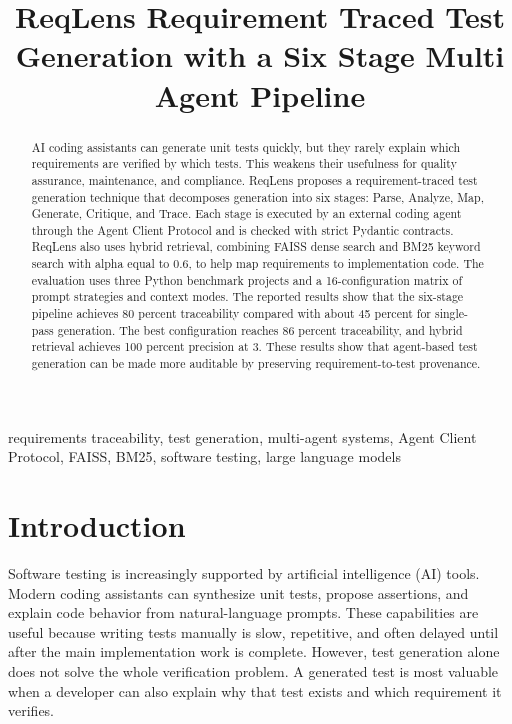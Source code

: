 \documentclass[conference]{IEEEtran}
\begin{document}
\title{ReqLens Requirement Traced Test Generation with a Six Stage Multi Agent Pipeline}

\author{
}

\maketitle

\begin{abstract}
AI coding assistants can generate unit tests quickly, but they rarely explain
which requirements are verified by which tests. This weakens their usefulness
for quality assurance, maintenance, and compliance. ReqLens proposes a
requirement-traced test generation technique that decomposes generation into
six stages: Parse, Analyze, Map, Generate, Critique, and Trace. Each stage is
executed by an external coding agent through the Agent Client Protocol and is
checked with strict Pydantic contracts. ReqLens also uses hybrid retrieval,
combining FAISS dense search and BM25 keyword search with alpha equal to 0.6,
to help map requirements to implementation code. The evaluation uses three
Python benchmark projects and a 16-configuration matrix of prompt strategies
and context modes. The reported results show that the six-stage pipeline
achieves 80 percent traceability compared with about 45 percent for single-pass
generation. The best configuration reaches 86 percent traceability, and
hybrid retrieval achieves 100 percent precision at 3. These results show that
agent-based test generation can be made more auditable by preserving
requirement-to-test provenance.
\end{abstract}

\begin{IEEEkeywords}
requirements traceability, test generation, multi-agent systems, Agent Client
Protocol, FAISS, BM25, software testing, large language models
\end{IEEEkeywords}

\section{Introduction}
Software testing is increasingly supported by artificial intelligence (AI)
tools. Modern coding assistants can synthesize unit tests, propose assertions,
and explain code behavior from natural-language prompts. These capabilities are
useful because writing tests manually is slow, repetitive, and often delayed
until after the main implementation work is complete. However, test generation
alone does not solve the whole verification problem. A generated test is most
valuable when a developer can also explain why that test exists and which
requirement it verifies.
\end{document}
